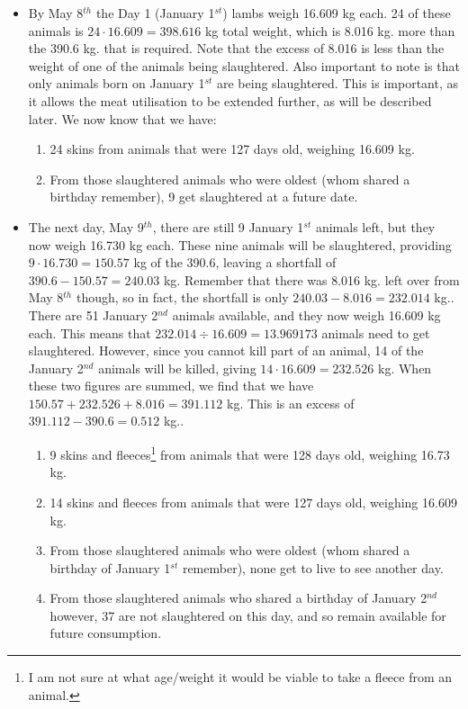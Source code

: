 \begin{itemize}
  \item By May 8$^{th}$ the Day 1 (January 1$^{st}$) lambs weigh 16.609 kg each. 24 of these animals is $24 \cdot 16.609 = 398.616$ kg total weight, which is 8.016 kg. more than the 390.6 kg. that is required.  %
  Note that the excess of 8.016 is less than the weight of one of the animals being slaughtered.  Also important to note is that only animals born on January 1$^{st}$ are being slaughtered.  This is important, as it allows the meat utilisation to be extended further, as will be described later. We now know that we have:
  \begin{enumerate}
    \item 24 skins from animals that were 127 days old, weighing 16.609 kg.%
    \item From those slaughtered animals who were oldest (whom shared a birthday remember), 9 get slaughtered at a future date.
  \end{enumerate}

  \item The next day, May 9$^{th}$, there are still 9 January 1$^{st}$ animals left, but they now weigh 16.730 kg each.  These nine animals will be slaughtered, providing $9 \cdot 16.730 = 150.57$ kg of the 390.6, leaving a shortfall of $390.6 - 150.57 = 240.03$ kg.  Remember that there was 8.016 kg. left over from May 8$^{th}$ though, so in fact, the shortfall is only $240.03 - 8.016 = 232.014$ kg..  There are 51 January 2$^{nd}$ animals available, and they now weigh 16.609 kg each.  This means that $232.014 \div 16.609 = 13.969173$ animals need to get slaughtered.  However, since you cannot kill part of an animal, 14 of the January 2$^{nd}$ animals will be killed, giving $14 \cdot 16.609 = 232.526$ kg.  When these two figures are summed, we find that we have $150.57 + 232.526 + 8.016 = 391.112$ kg.  This is an excess of $391.112 - 390.6 = 0.512$ kg..%
  \begin{enumerate}
    \item 9 skins and fleeces\footnote{I am not sure at what age/weight it would be viable to take a fleece from an animal.} from animals that were 128 days old, weighing 16.73 kg.
    \item 14 skins and fleeces from animals that were 127 days old, weighing 16.609 kg.
    \item From those slaughtered animals who were oldest (whom shared a birthday of January 1$^{st}$ remember), none get to live to see another day.
    \item From those slaughtered animals who shared a birthday of January 2$^{nd}$ however, 37 are not slaughtered on this day, and so remain available for future consumption.
  \end{enumerate}
\end{itemize}
